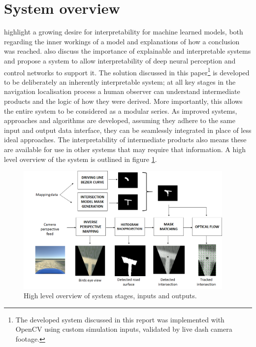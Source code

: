 \documentclass[]{aiaa-tc}%
\begin{document}
\section{System overview}
\citet{explainableAIStakeholders} highlight a growing desire for interpretability for machine learned models, both regarding the inner workings of a model and explanations of how a conclusion was reached. \citet{explainableCNNBookChapter} also discuss the importance of explainable and interpretable systems and propose a system to allow interpretability of deep neural perception and control networks to support it. The solution discussed in this paper\footnote{The developed system discussed in this report was implemented with OpenCV using custom simulation inputs, validated by live dash camera footage.} is developed to be deliberately an inherently interpretable system; at all key stages in the navigation localisation process a human observer can understand intermediate products and the logic of how they were derived.  More importantly, this allows the entire system to be considered as a modular series. As improved systems, approaches and algorithms are developed, assuming they adhere to the same input and output data interface, they can be seamlessly integrated in place of less ideal approaches. The interpretability of intermediate products also means these are available for use in other systems that may require that information. A high level overview of the system is outlined in figure \ref{f:systemOverview}.

\begin{figure}
	\centering
	\includegraphics[width=0.95\textwidth]{systemOverview.png}
	\caption{High level overview of system stages, inputs and outputs.}
	\label{f:systemOverview}
\end{figure}
\end{document}
